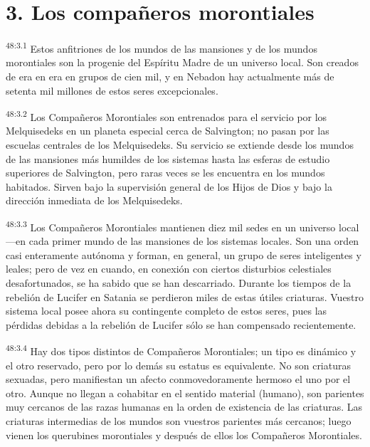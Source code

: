 \section*{3. Los compañeros morontiales}
\par
\textsuperscript{48:3.1} Estos anfitriones de los mundos de las mansiones y de los mundos morontiales son la progenie del Espíritu Madre de un universo local. Son creados de era en era en grupos de cien mil, y en Nebadon hay actualmente más de setenta mil millones de estos seres excepcionales.

\par
\textsuperscript{48:3.2} Los Compañeros Morontiales son entrenados para el servicio por los Melquisedeks en un planeta especial cerca de Salvington; no pasan por las escuelas centrales de los Melquisedeks. Su servicio se extiende desde los mundos de las mansiones más humildes de los sistemas hasta las esferas de estudio superiores de Salvington, pero raras veces se les encuentra en los mundos habitados. Sirven bajo la supervisión general de los Hijos de Dios y bajo la dirección inmediata de los Melquisedeks.

\par
\textsuperscript{48:3.3} Los Compañeros Morontiales mantienen diez mil sedes en un universo local ---en cada primer mundo de las mansiones de los sistemas locales. Son una orden casi enteramente autónoma y forman, en general, un grupo de seres inteligentes y leales; pero de vez en cuando, en conexión con ciertos disturbios celestiales desafortunados, se ha sabido que se han descarriado. Durante los tiempos de la rebelión de Lucifer en Satania se perdieron miles de estas útiles criaturas. Vuestro sistema local posee ahora su contingente completo de estos seres, pues las pérdidas debidas a la rebelión de Lucifer sólo se han compensado recientemente.

\par
\textsuperscript{48:3.4} Hay dos tipos distintos de Compañeros Morontiales; un tipo es dinámico y el otro reservado, pero por lo demás su estatus es equivalente. No son criaturas sexuadas, pero manifiestan un afecto conmovedoramente hermoso el uno por el otro. Aunque no llegan a cohabitar en el sentido material
(humano), son parientes muy cercanos de las razas humanas en la orden de existencia de las criaturas. Las criaturas intermedias de los mundos son vuestros parientes más cercanos; luego vienen los querubines morontiales y después de ellos los Compañeros Morontiales.

